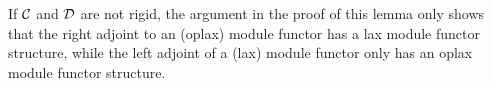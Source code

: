 \documentclass{amsart}
\begin{document}
\begin{remark}
If $\mathcal C$ and $\mathcal D$ are not rigid, the argument in the proof of this lemma only shows that the right adjoint to an (oplax) module functor has a lax module functor structure, while the left adjoint of a (lax) module functor only has an oplax module functor structure.  %
\end{remark}







\end{document}
